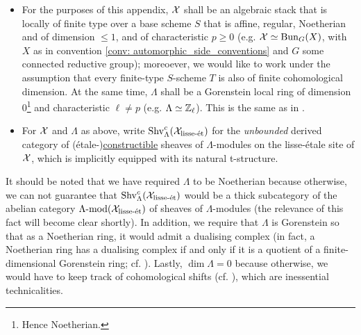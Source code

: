     \begin{convention} \label{conv: l_adic_sheaves_conventions}
        \noindent
        \begin{itemize}
            \item For the purposes of this appendix, $\mathcal{X}$ shall be an algebraic stack that is locally of finite type over a base scheme $S$ that is affine, regular, Noetherian and of dimension $\leq 1$, and of characteristic $p \geq 0$ (e.g. $\mathcal{X} \simeq \mathrm{Bun}_G(X)$, with $X$ as in convention \ref{conv: automorphic_side_conventions} and $G$ some connected reductive group); moreoever, we would like to work under the assumption that every finite-type $S$-scheme $T$ is also of finite cohomological dimension. At the same time, $\Lambda$ shall be a Gorenstein local ring of dimension $0$\footnote{Hence Noetherian.} and characteristic $\ell \not = p$ (e.g. $\Lambda \simeq \mathbb{Z}_{\ell}$). This is the same as in \cite{laszlo_olsson_adic_sheaves_on_artin_stacks_1}.
            \item For $\mathcal{X}$ and $\Lambda$ as above, write $\mathrm{Shv}_{\Lambda}^c(\mathcal{X}_{\mathrm{lisse}\text{-}\mathrm{\acute{e}t}})$ for the \textit{unbounded} derived category of (\'etale-)\href{https://stacks.math.columbia.edu/tag/03RW}{\underline{constructible}} sheaves of $\Lambda$-modules on the lisse-\'etale site of $\mathcal{X}$, which is implicitly equipped with its natural t-structure.
        \end{itemize}
    \end{convention}
    \begin{remark}
        It should be noted that we have required $\Lambda$ to be Noetherian because otherwise, we can not guarantee that $\mathrm{Shv}_{\Lambda}^c(\mathcal{X}_{\mathrm{lisse}\text{-}\mathrm{\acute{e}t}})$ would be a thick subcategory of the abelian category $\Lambda\text{-}\mathrm{mod}(\mathcal{X}_{\mathrm{lisse}\text{-}\mathrm{\acute{e}t}})$ of sheaves of $\Lambda$-modules (the relevance of this fact will become clear shortly). In addition, we require that $\Lambda$ is Gorenstein so that as a Noetherian ring, it would admit a dualising complex (in fact, a Noetherian ring has a dualising complex if and only if it is a quotient of a finite-dimensional Gorenstein ring; cf. \cite[Corollary 1.4]{kawasaki_macaulayfication_of_noetherian_rings}). Lastly, $\dim \Lambda = 0$ because otherwise, we would have to keep track of cohomological shifts (cf. \cite[\href{https://stacks.math.columbia.edu/tag/0AWS}{Tag 0AWS} and \href{https://stacks.math.columbia.edu/tag/0B5A}{Tag 0B5A}]{stacks}), which are inessential technicalities.
    \end{remark}
    
